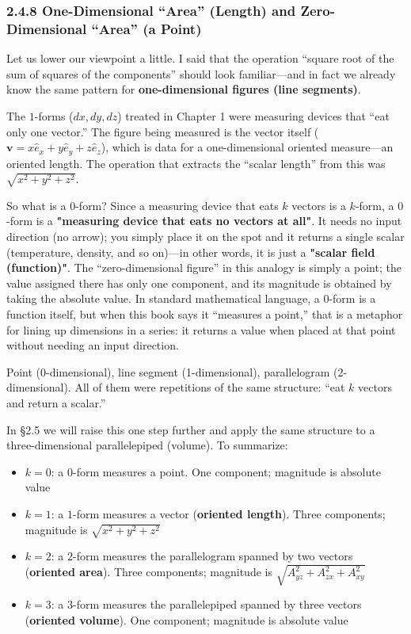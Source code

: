 \hypertarget{one-dimensional-area-length-and-zero-dimensional-area-a-point}{%
\subsubsection{2.4.8 One-Dimensional ``Area'' (Length) and
Zero-Dimensional ``Area'' (a
Point)}\label{one-dimensional-area-length-and-zero-dimensional-area-a-point}}

Let us lower our viewpoint a little. I said that the operation ``square
root of the sum of squares of the components'' should look
familiar---and in fact we already know the same pattern for
\textbf{one-dimensional figures (line segments)}.

The \(1\)-forms (\(dx, dy, dz\)) treated in Chapter 1 were measuring
devices that ``eat only one vector.'' The figure being measured is the
vector itself (\(\mathbf{v} = x\hat{e}_x + y\hat{e}_y + z\hat{e}_z\)),
which is data for a one-dimensional oriented measure---an oriented
length. The operation that extracts the ``scalar length'' from this was
\(\sqrt{x^2+y^2+z^2}\).

So what is a \(0\)-form? Since a measuring device that eats \(k\)
vectors is a \(k\)-form, a \(0\)-form is a
\textbf{"measuring device that eats no vectors at all"}. It needs no
input direction (no arrow); you simply place it on the spot and it
returns a single scalar (temperature, density, and so on)---in other
words, it is just a \textbf{"scalar field (function)"}. The
``zero-dimensional figure'' in this analogy is simply a point; the value
assigned there has only one component, and its magnitude is obtained by
taking the absolute value. In standard mathematical language, a
\(0\)-form is a function itself, but when this book says it ``measures a
point,'' that is a metaphor for lining up dimensions in a series: it
returns a value when placed at that point without needing an input
direction.

Point (0-dimensional), line segment (1-dimensional), parallelogram
(2-dimensional). All of them were repetitions of the same structure:
``eat \(k\) vectors and return a scalar.''

In §2.5 we will raise this one step further and apply the same structure
to a three-dimensional parallelepiped (volume). To summarize:

\begin{itemize}
\item
  \(k=0\): a \(0\)-form measures a point. One component; magnitude is
  absolute value
\item
  \(k=1\): a \(1\)-form measures a vector (\textbf{oriented length}).
  Three components; magnitude is \(\sqrt{x^2+y^2+z^2}\)
\item
  \(k=2\): a \(2\)-form measures the parallelogram spanned by two
  vectors (\textbf{oriented area}). Three components; magnitude is
  \(\sqrt{A_{yz}^2+A_{zx}^2+A_{xy}^2}\)
\item
  \(k=3\): a \(3\)-form measures the parallelepiped spanned by three
  vectors (\textbf{oriented volume}). One component; magnitude is
  absolute value
\end{itemize}

